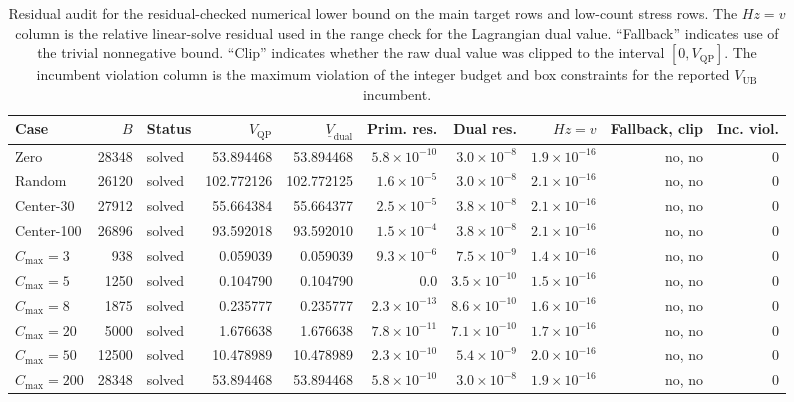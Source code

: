 \begin{table}[h]\centering\scriptsize\setlength{\tabcolsep}{1.5pt}
\caption{Residual audit for the residual-checked numerical lower bound on the
main target rows and low-count stress rows. The $Hz=v$ column is the relative
linear-solve residual used in the range check for the Lagrangian dual value.
``Fallback'' indicates use of the trivial nonnegative bound. ``Clip'' indicates
whether the raw dual value was clipped to the interval $[0,V_{\mathrm{QP}}]$.
The incumbent violation column is the maximum violation of the integer budget
and box constraints for the reported $V_{\mathrm{UB}}$ incumbent.}
\label{tab:residual-audit-si}
\begin{tabular}{lrlrrrrrrr}
\toprule
Case & $B$ & Status & $V_{\mathrm{QP}}$ & $\underline V_{\mathrm{dual}}$ &
Prim. res. & Dual res. & $Hz=v$ & Fallback, clip & Inc. viol.\\
\midrule
Zero       & 28348 & solved &  53.894468 &  53.894468 & $5.8{\times}10^{-10}$ & $3.0{\times}10^{-8}$ & $1.9{\times}10^{-16}$ & no, no & 0\\
Random     & 26120 & solved & 102.772126 & 102.772125 & $1.6{\times}10^{-5}$  & $3.0{\times}10^{-8}$ & $2.1{\times}10^{-16}$ & no, no & 0\\
Center-30  & 27912 & solved &  55.664384 &  55.664377 & $2.5{\times}10^{-5}$  & $3.8{\times}10^{-8}$ & $2.1{\times}10^{-16}$ & no, no & 0\\
Center-100 & 26896 & solved &  93.592018 &  93.592010 & $1.5{\times}10^{-4}$  & $3.8{\times}10^{-8}$ & $2.1{\times}10^{-16}$ & no, no & 0\\
$C_{\max}=3$   &   938 & solved &   0.059039 &   0.059039 & $9.3{\times}10^{-6}$  & $7.5{\times}10^{-9}$ & $1.4{\times}10^{-16}$ & no, no & 0\\
$C_{\max}=5$   &  1250 & solved &   0.104790 &   0.104790 & $0.0$                 & $3.5{\times}10^{-10}$& $1.5{\times}10^{-16}$ & no, no & 0\\
$C_{\max}=8$   &  1875 & solved &   0.235777 &   0.235777 & $2.3{\times}10^{-13}$ & $8.6{\times}10^{-10}$& $1.6{\times}10^{-16}$ & no, no & 0\\
$C_{\max}=20$  &  5000 & solved &   1.676638 &   1.676638 & $7.8{\times}10^{-11}$ & $7.1{\times}10^{-10}$& $1.7{\times}10^{-16}$ & no, no & 0\\
$C_{\max}=50$  & 12500 & solved &  10.478989 &  10.478989 & $2.3{\times}10^{-10}$ & $5.4{\times}10^{-9}$ & $2.0{\times}10^{-16}$ & no, no & 0\\
$C_{\max}=200$ & 28348 & solved &  53.894468 &  53.894468 & $5.8{\times}10^{-10}$ & $3.0{\times}10^{-8}$ & $1.9{\times}10^{-16}$ & no, no & 0\\
\bottomrule
\end{tabular}
\end{table}

